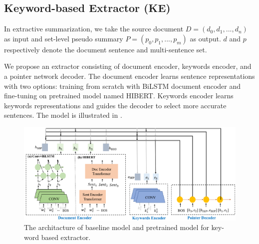 \subsection{Keyword-based Extractor (KE)}

In extractive summarization,
we take the source document $D = (d_0, d_1, ..., d_n)$ as input and set-level 
pseudo summary $P = (p_0, p_1,...,p_m)$ as output.
$d$ and $p$ respectively denote the document sentence and multi-sentence set.

We propose an extractor consisting of document encoder, keywords encoder,
and a pointer network decoder.
The document encoder learns sentence representations with two options:
training from scratch with BiLSTM document encoder and fine-tuning on pretrained model named 
HIBERT.
Keywords encoder learns keywords representations
and guides the decoder to select more accurate sentences.
The model is illustrated in .

\begin{figure}[th]
    \centering
    \includegraphics[width=0.8\linewidth]{model}
    \caption{The architacture of baseline model and pretrained model for key-word based extractor. }
    \label{fig:model}
\end{figure}


